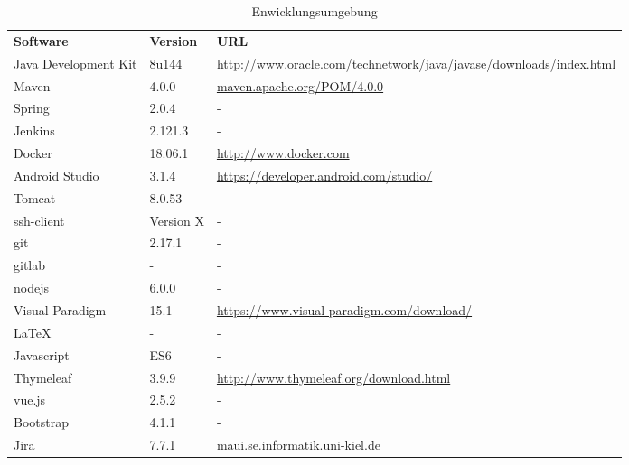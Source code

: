 \begin{table}[h]
	\centering
	\begin{tabularx}{\textwidth}{l l X}
		\rowcolor[HTML]{C0C0C0} 
		\textbf{Software} & \textbf{Version} & \textbf{URL} \\
		Java Development Kit & 8u144 & \url{http://www.oracle.com/technetwork/java/javase/downloads/index.html} \\
		\rowcolor[HTML]{E7E7E7} 
		Maven & 4.0.0 & \url{maven.apache.org/POM/4.0.0} \\
		Spring & 2.0.4 & - \\
		\rowcolor[HTML]{E7E7E7} 
		Jenkins & 2.121.3 & - \\
		Docker & 18.06.1 & \url{http://www.docker.com} \\
		\rowcolor[HTML]{E7E7E7} 
		Android Studio & 3.1.4 & \url{https://developer.android.com/studio/}\\
		Tomcat & 8.0.53 & - \\
		\rowcolor[HTML]{E7E7E7} 
		ssh-client & Version X & - \\
		git & 2.17.1 & - \\
		\rowcolor[HTML]{E7E7E7} 
		gitlab & - & - \\
		nodejs & 6.0.0 & - \\
		\rowcolor[HTML]{E7E7E7} 
		Visual Paradigm & 15.1 & \url{https://www.visual-paradigm.com/download/}\\
		LaTeX & - & - \\
		\rowcolor[HTML]{E7E7E7} 
		Javascript & ES6 & -\\
		Thymeleaf & 3.9.9 & \url{http://www.thymeleaf.org/download.html} \\
		\rowcolor[HTML]{E7E7E7} 
		vue.js & 2.5.2 & - \\
		Bootstrap & 4.1.1 & -\\
		\rowcolor[HTML]{E7E7E7} 
		Jira & 7.7.1 & \url{maui.se.informatik.uni-kiel.de} \\
	\end{tabularx}
	\caption{Enwicklungsumgebung}
	\label{table:entwicklungsumgebung}
\end{table}